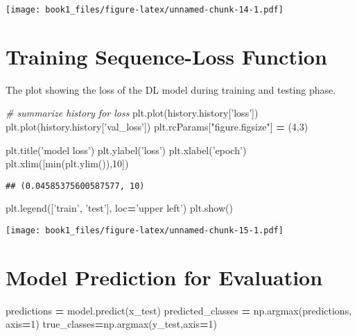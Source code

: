 \documentclass[]{book}
\newenvironment{Shaded}{\begin{snugshade}}{\end{snugshade}}
\newcommand{\BuiltInTok}[1]{#1}
\newcommand{\CommentTok}[1]{\textcolor[rgb]{0.56,0.35,0.01}{\textit{#1}}}
\newcommand{\DecValTok}[1]{\textcolor[rgb]{0.00,0.00,0.81}{#1}}
\newcommand{\NormalTok}[1]{#1}
\newcommand{\OperatorTok}[1]{\textcolor[rgb]{0.81,0.36,0.00}{\textbf{#1}}}
\newcommand{\StringTok}[1]{\textcolor[rgb]{0.31,0.60,0.02}{#1}}
\begin{document}
\texttt{[image: book1\_files/figure-latex/unnamed-chunk-14-1.pdf]}

\hypertarget{training-sequence-loss-function}{%
\section{Training Sequence-Loss Function}\label{training-sequence-loss-function}}

The plot showing the loss of the DL model during training and testing phase.

\begin{Shaded}
\begin{Highlighting}[]

\CommentTok{# summarize history for loss}
\NormalTok{plt.plot(history.history[}\StringTok{'loss'}\NormalTok{])}
\NormalTok{plt.plot(history.history[}\StringTok{'val_loss'}\NormalTok{])}
\NormalTok{plt.rcParams[}\StringTok{"figure.figsize"}\NormalTok{] }\OperatorTok{=}\NormalTok{ (}\DecValTok{4}\NormalTok{,}\DecValTok{3}\NormalTok{)}

\NormalTok{plt.title(}\StringTok{'model loss'}\NormalTok{)}
\NormalTok{plt.ylabel(}\StringTok{'loss'}\NormalTok{)}
\NormalTok{plt.xlabel(}\StringTok{'epoch'}\NormalTok{)}
\NormalTok{plt.xlim([}\BuiltInTok{min}\NormalTok{(plt.ylim()),}\DecValTok{10}\NormalTok{])}
\end{Highlighting}
\end{Shaded}

\begin{verbatim}
## (0.04585375600587577, 10)
\end{verbatim}

\begin{Shaded}
\begin{Highlighting}[]
\NormalTok{plt.legend([}\StringTok{'train'}\NormalTok{, }\StringTok{'test'}\NormalTok{], loc}\OperatorTok{=}\StringTok{'upper left'}\NormalTok{)}
\NormalTok{plt.show()}
\end{Highlighting}
\end{Shaded}

\texttt{[image: book1\_files/figure-latex/unnamed-chunk-15-1.pdf]}

\hypertarget{model-prediction-for-evaluation}{%
\section{Model Prediction for Evaluation}\label{model-prediction-for-evaluation}}

\begin{Shaded}
\begin{Highlighting}[]
\NormalTok{predictions }\OperatorTok{=}\NormalTok{ model.predict(x_test)}
\NormalTok{predicted_classes }\OperatorTok{=}\NormalTok{ np.argmax(predictions, axis}\OperatorTok{=}\DecValTok{1}\NormalTok{)}
\NormalTok{true_classes}\OperatorTok{=}\NormalTok{np.argmax(y_test,axis}\OperatorTok{=}\DecValTok{1}\NormalTok{)}
\end{Highlighting}
\end{Shaded}
\end{document}
